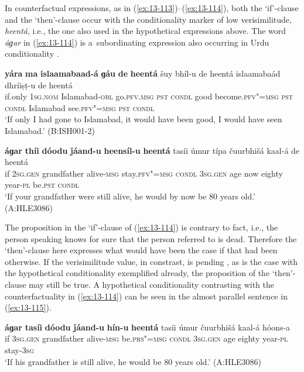  In counterfactual expressions, as in (\ref{ex:13-113})--(\ref{ex:13-114}), both the `if'-clause and the `then'-clause occur with the conditionality marker of low verisimilitude, \textit{heentá}, i.e., the one also used in the hypothetical expressions above. The word \textit{áɡar} in (\ref{ex:13-114}) is a~subordinating expression also occurring in Urdu conditionality \citep[101--103]{schmidt1999}.

\ea
\label{ex:13-113}
\gll \textbf{yára} \textbf{ma} \textbf{islaamabaad-á} \textbf{ɡáu} \textbf{de} \textbf{heentá} šuy bhíl-u de heentá islaamabaád  dhríiṣṭ-u de heentá\\
if.only \textsc{1sg.nom} Islamabad-\textsc{obl} go.\textsc{pfv.msg} \textsc{pst}  \textsc{condl} good become.\textsc{pfv"=msg} \textsc{pst} \textsc{condl} Islamabad see.\textsc{pfv"=msg} \textsc{pst} \textsc{condl}\\
\glt `If only I had gone to Islamabad, it would have been good, I would have seen Islamabad.' (B:ISH001-2)

\ex
\label{ex:13-114}
\gll \label{bkm:Ref190830564}\textbf{áɡar} \textbf{thíi} \textbf{dóodu} \textbf{ǰáand-u} \textbf{heensíl-u} \textbf{heentá} tasíi úmur típa čuurbhišá kaal-á de heentá\\
if \textsc{2sg.gen} grandfather alive-\textsc{msg} stay.\textsc{pfv"=msg}  \textsc{condl} 
\textsc{3sg.gen} age now eighty year-\textsc{pl} be.\textsc{pst} \textsc{condl} \\
\glt `If your grandfather were still alive, he would by now be 80 years old.' (A:HLE3086) 
\z

The proposition in the `if'-clause of (\ref{ex:13-114}) is contrary to fact, i.e., the person speaking knows for sure that the person referred to is dead. Therefore the `then'-clause here expresses what would have been the case if that had been otherwise. If the verisimilitude value, in constrast, is pending \citep[332]{givon2001b}, as is the case with the hypothetical conditionality exemplified already, the proposition of the `then'-clause may still be true. A hypothetical conditionality contrasting with the counterfactuality in (\ref{ex:13-114}) can be seen in the almost parallel sentence in (\ref{ex:13-115}).

\begin{exe}
\ex
\label{ex:13-115}
\gll \textbf{áɡar} \textbf{tasíi} \textbf{dóodu} \textbf{ǰáand-u} \textbf{hín-u} \textbf{heentá} tasíi úmur čuurbhišá kaal-á hóons-a \\
if \textsc{3sg.gen} grandfather alive-\textsc{msg} be.\textsc{prs"=msg}  \textsc{condl} \textsc{3sg.gen} age eighty year-\textsc{pl} stay-\textsc{3sg} \\
\glt `If his grandfather is still alive, he would be 80 years old.' (A:HLE3086) 
\end{exe}

